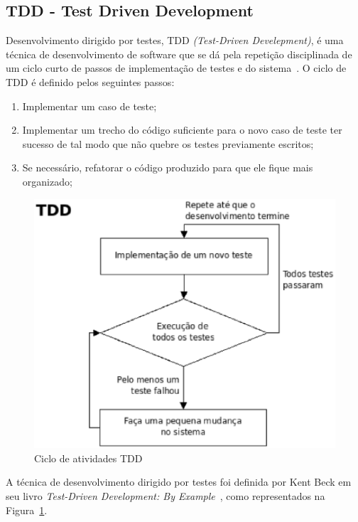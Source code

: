 \subsection{TDD - Test Driven Development}

Desenvolvimento dirigido por testes, TDD \textit{(Test-Driven Develepment)}, 
é uma técnica de desenvolvimento de software que se dá pela repetição disciplinada 
de um ciclo curto de passos de implementação de testes e do sistema~\cite{koskela2007}.
%
O ciclo de TDD é definido pelos seguintes passos:
%
\begin{enumerate}
\item Implementar um caso de teste;
\item Implementar um trecho do código suficiente para o novo caso de teste ter sucesso 
de tal modo que não quebre os testes previamente escritos;
\item Se necessário, refatorar o código produzido para que ele fique mais organizado;
\end{enumerate}

\begin{figure}[h]
    \centering
    \includegraphics[keepaspectratio=true,scale=0.50]
      {figuras/tdd_ciclo.eps}
    \caption{Ciclo de atividades TDD~\cite{beck2002}}
    \label{tdd_ciclo}
\end{figure}

A técnica de desenvolvimento dirigido por testes foi definida por Kent Beck em seu 
livro \textit{Test-Driven Development: By Example}~, como
representados na Figura~\ref{tdd_ciclo}.

